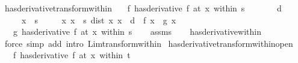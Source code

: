 \begin{isabellebody}
\endisatagproof
{\isafoldproof}%
%
\isadelimproof
%
\endisadelimproof
%
\isadelimdocument
%
\endisadelimdocument
%
\isatagdocument
%
\isamarkuptrue%
%
\endisatagdocument
{\isafolddocument}%
%
\isadelimdocument
%
\endisadelimdocument
{}\isamarkupfalse%
\ has{\isacharunderscore}{\kern0pt}derivative{\isacharunderscore}{\kern0pt}transform{\isacharunderscore}{\kern0pt}within{\isacharcolon}{\kern0pt}\isanewline
\ \ \ {\isachardoublequoteopen}{\isacharparenleft}{\kern0pt}f\ has{\isacharunderscore}{\kern0pt}derivative\ f{\isacharprime}{\kern0pt}{\isacharparenright}{\kern0pt}\ {\isacharparenleft}{\kern0pt}at\ x\ within\ s{\isacharparenright}{\kern0pt}{\isachardoublequoteclose}\isanewline
\ \ \ \ \ {\isachardoublequoteopen}{}\ {\isacharless}{\kern0pt}\ d{\isachardoublequoteclose}\isanewline
\ \ \ \ \ {\isachardoublequoteopen}x\ {\isasymin}\ s{\isachardoublequoteclose}\isanewline
\ \ \ \ \ {\isachardoublequoteopen}{\isasymAnd}x{\isacharprime}{\kern0pt}{\isachardot}{\kern0pt}\ {\isasymlbrakk}x{\isacharprime}{\kern0pt}\ {\isasymin}\ s{\isacharsemicolon}{\kern0pt}\ dist\ x{\isacharprime}{\kern0pt}\ x\ {\isacharless}{\kern0pt}\ d{\isasymrbrakk}\ {\isasymLongrightarrow}\ f\ x{\isacharprime}{\kern0pt}\ {\isacharequal}{\kern0pt}\ g\ x{\isacharprime}{\kern0pt}{\isachardoublequoteclose}\isanewline
\ \ \ {\isachardoublequoteopen}{\isacharparenleft}{\kern0pt}g\ has{\isacharunderscore}{\kern0pt}derivative\ f{\isacharprime}{\kern0pt}{\isacharparenright}{\kern0pt}\ {\isacharparenleft}{\kern0pt}at\ x\ within\ s{\isacharparenright}{\kern0pt}{\isachardoublequoteclose}\isanewline
%
\isadelimproof
\ \ %
\endisadelimproof
%
\isatagproof
{}\isamarkupfalse%
\ assms\isanewline
\ \ \isamarkupfalse%
\ has{\isacharunderscore}{\kern0pt}derivative{\isacharunderscore}{\kern0pt}within\isanewline
\ \ \isamarkupfalse%
\ {\isacharparenleft}{\kern0pt}force\ simp\ add{\isacharcolon}{\kern0pt}\ intro{\isacharcolon}{\kern0pt}\ Lim{\isacharunderscore}{\kern0pt}transform{\isacharunderscore}{\kern0pt}within{\isacharparenright}{\kern0pt}%
\endisatagproof
{\isafoldproof}%
%
\isadelimproof
\isanewline
%
\endisadelimproof
\isanewline
{}\isamarkupfalse%
\ has{\isacharunderscore}{\kern0pt}derivative{\isacharunderscore}{\kern0pt}transform{\isacharunderscore}{\kern0pt}within{\isacharunderscore}{\kern0pt}open{\isacharcolon}{\kern0pt}\isanewline
\ \ \ {\isachardoublequoteopen}{\isacharparenleft}{\kern0pt}f\ has{\isacharunderscore}{\kern0pt}derivative\ f{\isacharprime}{\kern0pt}{\isacharparenright}{\kern0pt}\ {\isacharparenleft}{\kern0pt}at\ x\ within\ t{\isacharparenright}{\kern0pt}{\isachardoublequoteclose}\isanewline

\end{isabellebody}
